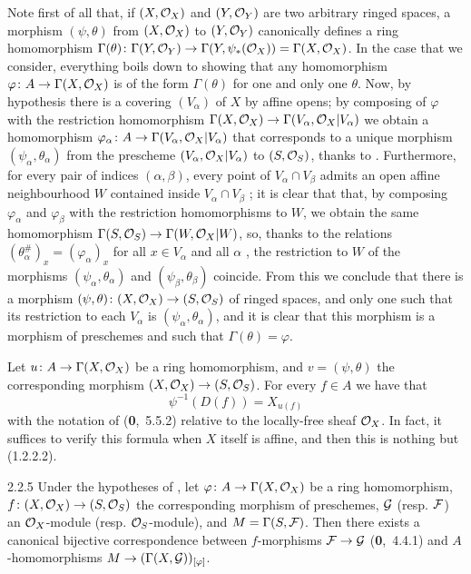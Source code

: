 Note first of all that, if $(X,\mathcal{O}_X)$ and $(Y,\mathcal{O}_Y)$ are two arbitrary ringed spaces,
a morphism $(\psi,\theta)$ from $(X,\mathcal{O}_X)$ to $(Y,\mathcal{O}_Y)$ canonically defines a ring
homomorphism
$\Gamma(\theta)\colon\Gamma(Y,\mathcal{O}_Y)\to\Gamma(Y,\psi_\ast(\mathcal{O}_X))=\Gamma(X,\mathcal{O}_X)$.
In the case that we consider, everything boils down to showing that any
homomorphism $\varphi\colon A\to\Gamma(X,\mathcal{O}_X)$ is of the form $\Gamma(\theta)$
for one and only one $\theta$. Now, by hypothesis there is a covering
$(V_\alpha)$ of $X$ by affine opens; by composing of $\varphi$ with the
restriction homomorphism $\Gamma(X,\mathcal{O}_X)\to\Gamma(V_\alpha,\mathcal{O}_X|V_\alpha)$ we
obtain a homomorphism $\varphi_\alpha\colon A\to\Gamma(V_\alpha,\mathcal{O}_X|V_\alpha)$
that corresponds to a unique morphism $(\psi_\alpha,\theta_\alpha)$ from the
prescheme $(V_\alpha,\mathcal{O}_X|V_\alpha)$ to $(S,\mathcal{O}_S)$, thanks to .
Furthermore, for every pair of indices $(\alpha,\beta)$, every point of
$V_\alpha\cap V_\beta$ admits an open affine neighbourhood $W$ contained inside
$V_\alpha\cap V_\beta$ ; it is clear that that, by composing
$\varphi_\alpha$ and $\varphi_\beta$ with the restriction homomorphisms to $W$,
we obtain the same homomorphism $\Gamma(S,\mathcal{O}_S)\to\Gamma(W,\mathcal{O}_X|W)$, so, thanks
to the relations $(\theta_\alpha^\#)_x=(\varphi_\alpha)_x$ for all $x\in
V_\alpha$ and all $\alpha$ , the restriction to $W$ of the morphisms
$(\psi_\alpha,\theta_\alpha)$ and $(\psi_\beta,\theta_\beta)$ coincide. From
this we conclude that there is a morphism
$(\psi,\theta)\colon(X,\mathcal{O}_X)\to(S,\mathcal{O}_S)$ of ringed spaces, and only one such
that its restriction to each $V_\alpha$ is $(\psi_\alpha,\theta_\alpha)$, and it
is clear that this morphism is a morphism of preschemes and such that
$\Gamma(\theta)=\varphi$.

Let $u\colon A\to\Gamma(X,\mathcal{O}_X)$ be a ring homomorphism, and $v=(\psi,\theta)$
the corresponding morphism $(X,\mathcal{O}_X)\to(S,\mathcal{O}_S)$. For every $f\in A$ we have
that
\[
  \psi^{-1}(D(f))=X_{u(f)}\tag{2.2.4.1}
\]
with the notation of (\textbf{0},~5.5.2) relative to the locally-free sheaf
$\mathcal{O}_X$. In fact, it suffices to verify this formula when $X$ itself is affine,
and then this is nothing but (1.2.2.2).

\begin{env}[Proposition]{2.2.5}
\label{prop-1.2.2.5}
Under the hypotheses of , let
$\varphi\colon A\to\Gamma(X,\mathcal{O}_X)$ be a ring homomorphism,
$f\colon(X,\mathcal{O}_X)\to(S,\mathcal{O}_S)$ the corresponding morphism of preschemes,
$\mathcal{G}$ (resp. $\mathcal{F}$) an $\mathcal{O}_X$-module (resp. $\mathcal{O}_S$-module), and
$M=\Gamma(S,\mathcal{F})$. Then there exists a canonical bijective
correspondence between $f$-morphisms $\mathcal{F}\to\mathcal{G}$
(\textbf{0},~4.4.1) and $A$-homomorphisms
$M\to(\Gamma(X,\mathcal{G}))_{[\varphi]}$.
\end{env}


